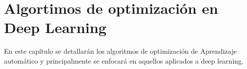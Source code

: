 \chapter{Algortimos de optimización en Deep Learning}
En este capítulo se detallarán los algoritmos de optimización de Aprendizaje automático y principalmente se enfocará en aquellos aplicados a deep learning.